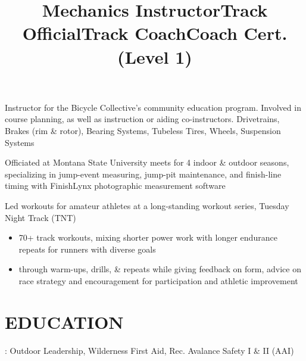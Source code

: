 \documentclass[resmargin, centered, 10pt]{../res}
\begin{document}
\begin{resume}
\title{Mechanics Instructor}
\begin{position}
	Instructor for the Bicycle Collective's community education program. Involved in course planning, as well as instruction or aiding co-instructors.  Drivetrains, Brakes (rim \& rotor), Bearing Systems, Tubeless Tires, Wheels, Suspension Systems
\end{position}

\title{Track Official}
\begin{position}
	Officiated at Montana State University meets for 4 indoor \& outdoor seasons, specializing in jump-event measuring, jump-pit maintenance, and finish-line timing with FinishLynx photographic measurement software
\end{position}

\title{Track Coach}
\begin{position}
	Led workouts for amateur athletes at a long-standing workout series, Tuesday Night Track (TNT) \\
	\begin{itemize}
		\item {} 70+ track workouts, mixing shorter power work with longer endurance repeats for runners with diverse goals
		\item {} through warm-ups, drills, \& repeats while giving feedback on form, advice on race strategy and encouragement for participation and athletic improvement
	\end{itemize}
\end{position}

\fullline

\section{EDUCATION}

: Outdoor Leadership, Wilderness First Aid, Rec. Avalance Safety I \& II (AAI)

\title{Coach Cert. (Level 1)}
\begin{position}
\end{position}


\end{resume}
\end{document}
